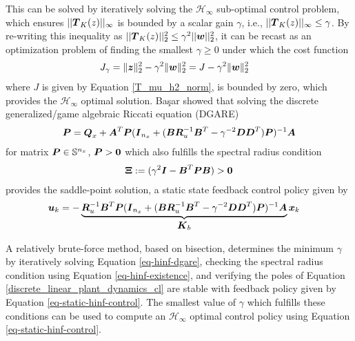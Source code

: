 This can be solved by iteratively solving the $\mathcal{H}_{\infty}$ sub-optimal control problem, which ensures $||\vb*{T}_{K}(z)||_{\infty}$ is bounded by a scalar gain $\gamma$, i.e., $||\vb*{T}_{K}(z)||_{\infty} \leq \gamma$.  By re-writing this inequality as $||\vb*{T}_{K}(z)||_{2}^{2} \leq \gamma^{2}  ||\vb*{w}||_{2}^{2}$, it can be recast as an optimization problem of finding the smallest $\gamma \geq 0$ under which the cost function
\begin{equation}
\begin{aligned}
	J_{\gamma} &= \lVert \vb*{z} \rVert_{2}^{2} - \gamma^{2} \lVert \vb*{w} \rVert_{2}^{2}
	= J - \gamma^{2} \lVert \vb*{w} \rVert_{2}^{2} \label{eq-lq-cost-infinite-w}
\end{aligned}
\end{equation}
where $J$ is given by Equation \eqref{T_mu_h2_norm}, is bounded by zero, which provides the $\mathcal{H}_{\infty}$ optimal solution.  Ba{\c{s}}ar \cite{bacsar2008h} showed that solving the discrete generalized/game algebraic Riccati equation (DGARE)
\begin{equation}
\begin{aligned}
	\vb*{P} &= \vb*{Q}_{x} + \vb*{A}^{T}\vb*{P}(\vb*{I}_{n_{x}}
		+ (\vb*{B}\vb*{R}_{u}^{-1}\vb*{B}^{T} - \gamma^{-2}\vb*{D}\vb*{D}^{T})\vb*{P})^{-1}\vb*{A}\\
\end{aligned} \label{eq-hinf-dgare}
\end{equation}
for matrix $\vb*{P} \in \mathbb{S}^{n_{x}}$, $\vb*{P} > \vb*{0}$ which also fulfills the spectral radius condition 
\begin{equation}
\begin{aligned}
	\vb*{\Xi} := (\gamma^{2}\vb*{I} - \vb*{B}^{T}\vb*{P}\vb*{B}) > \vb*{0}
\end{aligned} \label{eq-hinf-existence}
\end{equation}
provides the saddle-point solution, a static state feedback control policy given by
\begin{equation}
\begin{aligned}
	\vb*{u}_{k} &= -\underbrace{
	\vb*{R}_{u}^{-1}\vb*{B}^{T}\vb*{P}(\vb*{I}_{n_{x}}
		+ (\vb*{B}\vb*{R}_{u}^{-1}\vb*{B}^{T} - \gamma^{-2}\vb*{D}\vb*{D}^{T})\vb*{P})^{-1}\vb*{A}
	}_{\text{\normalsize $\vb*{K}_{b}$}}
	\vb*{x}_{k}
\end{aligned} \label{eq-static-hinf-control}
\end{equation}

A relatively brute-force method, based on bisection, determines the minimum $\gamma$ by iteratively solving Equation \eqref{eq-hinf-dgare}, checking the spectral radius condition using Equation \eqref{eq-hinf-existence}, and verifying the poles of Equation \eqref{discrete_linear_plant_dynamics_cl} are stable with feedback policy given by Equation \eqref{eq-static-hinf-control}.  The smallest value of $\gamma$ which fulfills these conditions can be used to compute an $\mathcal{H}_{\infty}$ optimal control policy using Equation \eqref{eq-static-hinf-control}.

